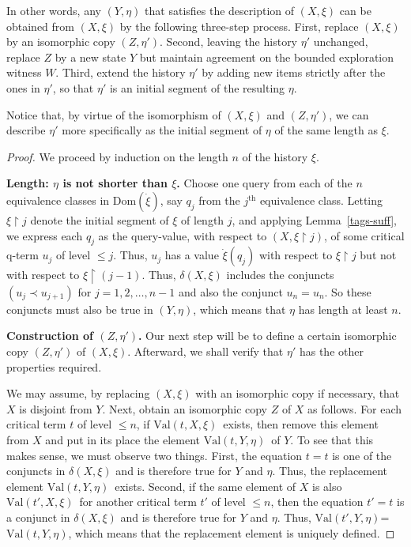 \documentclass{LMCS}
\theoremstyle{definition}
\newcommand{\ans}{\dot}
\newcommand{\dom}[1]{\ensuremath{{\text{Dom}}(#1)}}
\newcommand{\restr}{\mathop{\upharpoonright}}
\newcommand{\val}[3]{\ensuremath{\text{Val}(#1,#2,#3)}}
\renewcommand{\th}{\ensuremath{{}^{\text{th}}}}
\begin{document}
In other words, any $(Y,\eta)$ that satisfies the description of
$(X,\xi)$ can be obtained from $(X,\xi)$ by the following three-step
process.  First, replace $(X,\xi)$ by an isomorphic copy $(Z,\eta')$.
Second, leaving the history $\eta'$ unchanged, replace $Z$ by a new
state $Y$ but maintain agreement on the bounded exploration witness
$W$.  Third, extend the history $\eta'$ by adding new items strictly
after the ones in $\eta'$, so that $\eta'$ is an initial segment of
the resulting $\eta$.

Notice that, by virtue of the isomorphism of $(X,\xi)$ and
$(Z,\eta')$, we can describe $\eta'$ more specifically as the initial
segment of $\eta$ of the same length as $\xi$.

\begin{proof}
We proceed by induction on the length $n$ of the history $\xi$.

\smallskip\noindent\textbf{Length: $\eta$ is not shorter than $\xi$.}
Choose one query from each of the $n$ equivalence classes in
\dom{\ans\xi}, say $q_j$ from the $j\th$ equivalence class.  Letting
$\xi\restr j$ denote the initial segment of $\xi$ of length $j$, and
applying Lemma~\ref{tags-suff}, we express each $q_j$ as the query-value,
with respect to $(X,\xi\restr j)$, of some critical q-term $u_j$ of level
$\leq j$.  Thus, $u_j$ has a value $\dot\xi(q_j)$ with respect to
$\xi\restr j$ but not with respect to $\xi\restr(j-1)$.  Thus,
$\delta(X,\xi)$ includes the conjuncts $(u_j\prec u_{j+1})$ for
$j=1,2,\dots,n-1$ and also the conjunct $u_n=u_n$.  So these conjuncts
must also be true in $(Y,\eta)$, which means that $\eta$ has length at
least $n$.

\medskip\noindent\textbf{Construction of $(Z,\eta')$.} Our next
step will be to define a certain isomorphic copy $(Z,\eta')$ of
$(X,\xi)$.  Afterward, we shall verify that $\eta'$ has the other
properties required.

 We may assume, by replacing $(X,\xi)$ with an isomorphic copy if
necessary, that $X$ is disjoint from $Y$.  Next, obtain an isomorphic
copy $Z$ of $X$ as follows.  For each critical term $t$ of level $\leq
n$, if \val tX\xi\ exists, then remove this element from $X$ and put
in its place the element \val tY\eta\ of $Y$.  To see that this makes
sense, we must observe two things.  First, the equation $t=t$ is one
of the conjuncts in $\delta(X,\xi)$ and is therefore true for $Y$ and
$\eta$.  Thus, the replacement element \val tY\eta\ exists.  Second,
if the same element of $X$ is also \val{t'}X\xi\ for another critical
term $t'$ of level $\leq n$, then the equation $t'=t$ is a conjunct in
$\delta(X,\xi)$ and is therefore true for $Y$ and $\eta$.  Thus,
\val{t'}Y\eta=\val tY\eta, which means that the replacement element is
uniquely defined.


\end{proof}
\end{document}
